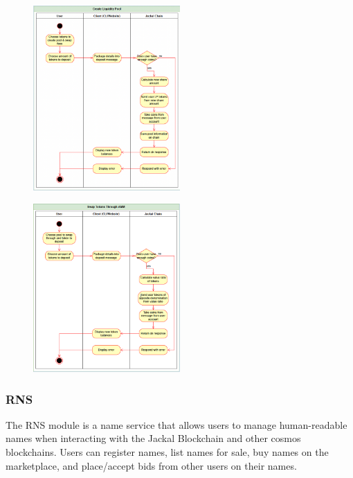 \documentclass[a4paper]{article}
\begin{document}
\begin{figure}[!htbp]
\centering
\includegraphics[width=0.5\textwidth]{assets/lp4.png}
\end{figure}

\begin{figure}[!htbp]
\centering
\includegraphics[width=0.5\textwidth]{assets/lp5.png}
\end{figure}

\newpage

\subsubsection{RNS}
The RNS module is a name service that allows users to manage human-readable names when interacting with the Jackal Blockchain and other cosmos blockchains. Users can register names, list names for sale, buy names on the marketplace, and place/accept bids from other users on their names.
\end{document}
